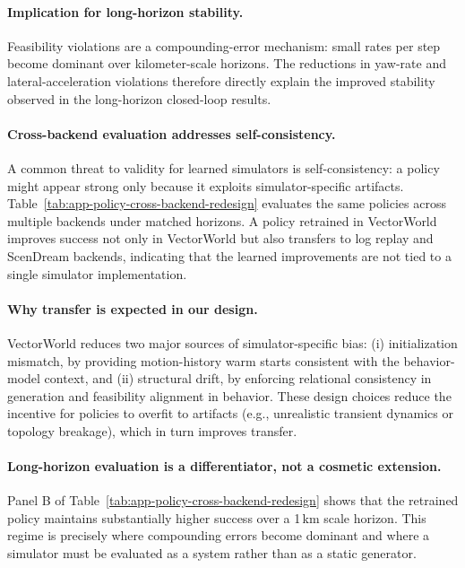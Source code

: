 \documentclass{article}
\theoremstyle{plain}
\theoremstyle{definition}
\theoremstyle{remark}
\begin{document}
\paragraph{Implication for long-horizon stability.}
Feasibility violations are a compounding-error mechanism: small rates per step become dominant over kilometer-scale horizons.
The reductions in yaw-rate and lateral-acceleration violations therefore directly explain the improved stability observed in the long-horizon closed-loop results.


\paragraph{Cross-backend evaluation addresses self-consistency.}
A common threat to validity for learned simulators is self-consistency: a policy might appear strong only because it exploits simulator-specific artifacts.
Table~\ref{tab:app-policy-cross-backend-redesign} evaluates the same policies across multiple backends under matched horizons.
A policy retrained in VectorWorld improves success not only in VectorWorld but also transfers to log replay and ScenDream backends, indicating that the learned
improvements are not tied to a single simulator implementation.

\paragraph{Why transfer is expected in our design.}
VectorWorld reduces two major sources of simulator-specific bias:
(i) initialization mismatch, by providing motion-history warm starts consistent with the behavior-model context,
and (ii) structural drift, by enforcing relational consistency in generation and feasibility alignment in behavior.
These design choices reduce the incentive for policies to overfit to artifacts (e.g., unrealistic transient dynamics or topology breakage),
which in turn improves transfer.

\paragraph{Long-horizon evaluation is a differentiator, not a cosmetic extension.}
Panel B of Table~\ref{tab:app-policy-cross-backend-redesign} shows that the retrained policy maintains substantially higher success over a 1\,km scale horizon.
This regime is precisely where compounding errors become dominant and where a simulator must be evaluated as a system rather than as a static generator.
\end{document}

